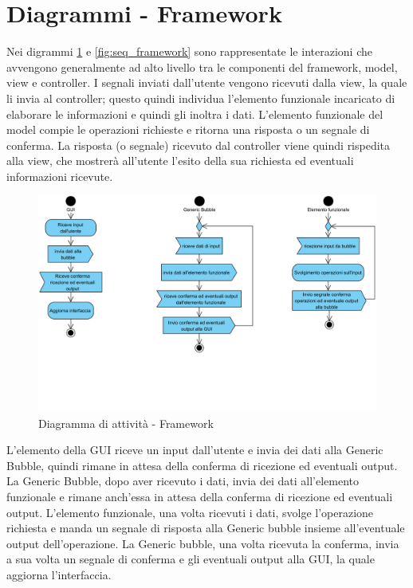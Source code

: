 \section{Diagrammi - Framework}

Nei digrammi \ref{fig:alt_framework} e \ref{fig:seq_framework} sono rappresentate le interazioni che avvengono generalmente ad alto
livello tra le componenti del framework, model, view e controller. I segnali inviati dall’utente
vengono ricevuti dalla view, la quale li invia al controller; questo quindi individua l’elemento
funzionale incaricato di elaborare le informazioni e quindi gli inoltra i dati. L’elemento funzionale
del model compie le operazioni richieste e ritorna una risposta o un segnale di conferma. La risposta (o segnale) ricevuto dal controller viene quindi rispedita alla view, che mostrerà all’utente l’esito della sua richiesta ed eventuali informazioni ricevute.

\begin{figure}[H]
	\centering
	\includegraphics[width=14cm]{diagrammi_img/attivita/framework.png}
	\caption{Diagramma di attività - Framework}
	\label{fig:alt_framework}
\end{figure}
L'elemento della GUI riceve un input dall'utente e invia dei dati alla Generic Bubble, quindi rimane in attesa della conferma di ricezione ed eventuali output. La Generic Bubble, dopo aver ricevuto i dati, invia dei dati all'elemento funzionale e rimane anch'essa in attesa della conferma di ricezione ed eventuali output. L'elemento funzionale, una volta ricevuti i dati, svolge l'operazione richiesta e manda un segnale di risposta alla Generic bubble insieme all'eventuale output dell'operazione. La Generic bubble, una volta ricevuta la conferma, invia a sua volta un segnale di conferma e gli eventuali output alla GUI, la quale aggiorna l'interfaccia.

